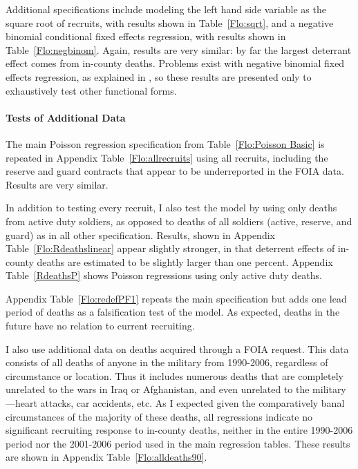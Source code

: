 \documentclass[12pt] {article}
\begin{document}
Additional specifications include modeling the left hand side variable as the square root of recruits, with results shown in Table~\ref{Flo:sqrt}, and a negative binomial conditional fixed effects regression, with results shown in Table~\ref{Flo:negbinom}. Again, results are very similar: by far the largest deterrant effect comes from in-county deaths. Problems exist with negative binomial fixed effects regression, as explained in \cite{negbinom}, so these results are presented only to exhaustively test other functional forms. 

\paragraph{Tests of Additional Data}
The main Poisson regression specification from Table~\ref{Flo:Poisson Basic} is repeated in Appendix Table~\ref{Flo:allrecruits} using all recruits, including the reserve and guard contracts that appear to be underreported in the FOIA data. Results are very similar. 

In addition to testing every recruit, I also test the model by using only deaths from active duty soldiers, as opposed to deaths of all soldiers (active, reserve, and guard) as in all other specification. Results, shown in Appendix Table~\ref{Flo:Rdeathslinear} appear slightly stronger, in that deterrent effects of in-county deaths are estimated to be slightly larger than one percent. Appendix Table~\ref{RdeathsP} shows Poisson regressions using only active duty deaths.

Appendix Table~\ref{Flo:redefPF1} repeats the main specification but adds one lead period of deaths as a falsification test of the model. As expected, deaths in the future have no relation to current recruiting.

I also use additional data on deaths acquired through a FOIA request. This data consists of all deaths of anyone in the military from 1990-2006, regardless of circumstance or location. Thus it includes numerous deaths that are completely unrelated to the wars in Iraq or Afghanistan, and even unrelated to the military---heart attacks, car accidents, etc. As I expected given the comparatively banal circumstances of the majority of these deaths, all regressions indicate no significant recruiting response to in-county deaths, neither in the entire 1990-2006 period nor the 2001-2006 period used in the main regression tables. These results are shown in Appendix Table~\ref{Flo:alldeaths90}.
\end{document}
